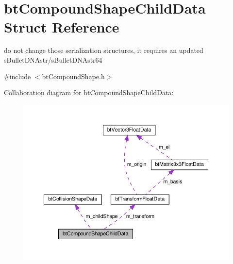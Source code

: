 \hypertarget{structbtCompoundShapeChildData}{}\section{bt\+Compound\+Shape\+Child\+Data Struct Reference}
\label{structbtCompoundShapeChildData}


do not change those serialization structures, it requires an updated s\+Bullet\+D\+N\+Astr/s\+Bullet\+D\+N\+Astr64  




{\ttfamily \#include $<$bt\+Compound\+Shape.\+h$>$}



Collaboration diagram for bt\+Compound\+Shape\+Child\+Data\+:
\nopagebreak
\begin{figure}[H]
\begin{center}
\leavevmode
\includegraphics[width=350pt]{structbtCompoundShapeChildData__coll__graph}
\end{center}
\end{figure}
